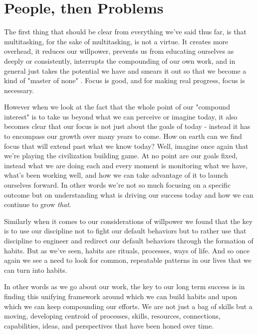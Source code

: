 \documentclass[11pt,a5paper]{book}
\begin{document}
\section{People, then Problems}
The first thing that should be clear from everything we've said thus far, is that multitasking, for the sake of multitasking, is not a virtue. It creates more overhead, it reduces our willpower, prevents us from educating ourselves as deeply or consistently, interrupts the compounding of our own work, and in general just takes the potential we have and smears it out so that we become a kind of "master of none" \cite{keller}. Focus is good, and for making real progress, focus is necessary. 
\newline

However when we look at the fact that the whole point of our "compound interest" is to take us beyond what we can perceive or imagine today, it also becomes clear that our focus is not just about the goals of today - instead it has to encompass our growth over many years to come. How on earth can we find focus that will extend past what we know today? Well, imagine once again that we're playing the civilization building game. At no point are our goals fixed, instead what we are doing each and every moment is monitoring what we have, what's been working well, and how we can take advantage of it to launch ourselves forward. In other words we're not so much focusing on a specific outcome but on understanding what is driving our success today and how we can continue to grow \textit{that}. 
\newline

Similarly when it comes to our considerations of willpower we found that the key is to use our discipline not to fight our default behaviors but to rather use that discipline to engineer and redirect our default behaviors through the formation of habits. But as we've seen, habits are rituals, processes, ways of life. And so once again we see a need to look for common, repeatable patterns in our lives that we can turn into habits. 
\newline

In other words as we go about our work, the key to our long term success is in finding this unifying framework around which we can build habits and upon which we can keep compounding our efforts. We are not just a bag of skills but a moving, developing centroid of processes, skills, resources, connections, capabilities, ideas, and perspectives that have been honed over time.
\newline
\end{document}
